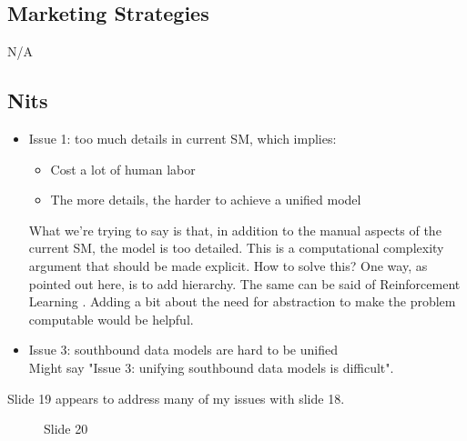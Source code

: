 \documentclass[11pt, oneside]{article}   	%
\begin{document}
\subsection{Marketing Strategies}
\label{slide18:marketing_strategies}
N/A

\subsection{Nits}
\label{slide18:nits}
\begin{itemize}
\item Issue 1: too much details in current SM, which implies:
\begin{itemize}
\item Cost a lot of human labor
\item The more details, the harder to achieve a unified model
\end{itemize}
What we're trying to say is that, in addition to the manual aspects of the current SM, the model is too detailed. This is a computational complexity argument that 
should be made explicit. How to solve this? One way, as pointed out here, is to add hierarchy. The same can be said of Reinforcement Learning
\cite{2018arXiv181001257N,}.   Adding a bit about the need for abstraction to make the problem computable would be helpful.
\item Issue 3: southbound data models are hard to be unified \\ Might say "Issue 3:  unifying southbound data models is difficult".
\end{itemize}

Slide 19 appears to address many of my issues with slide 18.

\begin{figure}
\caption{Slide 20}
\label{fig:slide20}
\end{figure}
\end{document}
